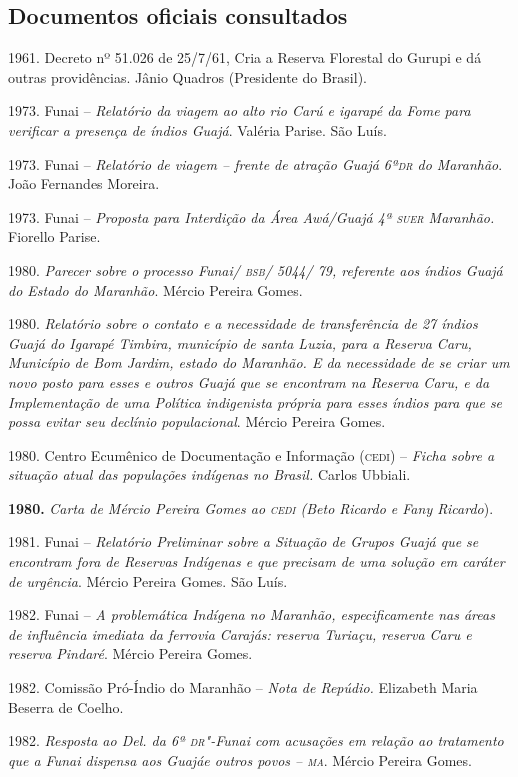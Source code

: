\begin{bibliohedra}
\section{Documentos oficiais consultados}

1961. Decreto nº 51.026 de 25/7/61, Cria a Reserva Florestal do
Gurupi e dá outras providências. Jânio Quadros (Presidente do Brasil).

1973. Funai -- \emph{Relatório da viagem ao alto rio Carú e
igarapé da Fome para verificar a presença de índios Guajá}. Valéria
Parise. São Luís.

1973. Funai -- \emph{Relatório de viagem -- frente de atração
Guajá 6ª\textsc{dr} do Maranhão}. João Fernandes Moreira.

1973. Funai -- \emph{Proposta para Interdição da Área Awá/Guajá
4ª \textsc{suer} Maranhão.} Fiorello Parise.

1980. \emph{Parecer sobre o processo Funai/ \textsc{bsb}/ 5044/ 79,
referente aos índios Guajá do Estado do Maranhão}. Mércio Pereira Gomes.

1980. \emph{Relatório sobre o contato e a necessidade de
transferência de 27 índios Guajá do Igarapé Timbira, município de santa
Luzia, para a Reserva Caru, Município de Bom Jardim, estado do Maranhão.
E da necessidade de se criar um novo posto para esses e outros Guajá que
se encontram na Reserva Caru, e da Implementação de uma Política
indigenista própria para esses índios para que se possa evitar seu
declínio populacional}. Mércio Pereira Gomes.

1980. Centro Ecumênico de Documentação e Informação (\textsc{cedi}) --
\emph{Ficha sobre a situação atual das populações indígenas no Brasil.}
Carlos Ubbiali.

\textbf{1980.} \emph{Carta de Mércio Pereira Gomes ao \textsc{cedi} (Beto Ricardo
e Fany Ricardo}).

1981. Funai -- \emph{Relatório Preliminar sobre a Situação de
Grupos Guajá que se encontram fora de Reservas Indígenas e que precisam
de uma solução em caráter de urgência}. Mércio Pereira Gomes. São Luís.

1982. Funai -- \emph{A problemática Indígena no Maranhão,
especificamente nas áreas de influência imediata da ferrovia Carajás:
reserva Turiaçu, reserva Caru e reserva Pindaré}. Mércio Pereira Gomes.

1982. Comissão Pró-Índio do Maranhão -- \emph{Nota de Repúdio.}
Elizabeth Maria Beserra de Coelho.

1982. \emph{Resposta ao Del. da 6ª \textsc{dr}"-Funai com acusações em
relação ao tratamento que a Funai dispensa aos Guajáe outros povos --
\textsc{ma}}. Mércio Pereira Gomes.


\end{bibliohedra}
